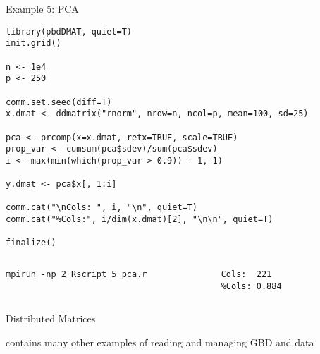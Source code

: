 \begin{frame}[fragile]
\fontsize{8pt}{7.2}\selectfont
  \begin{exampleblock}{Example 5:  PCA}
\begin{lstlisting}[basicstyle=\tiny,title=\fontsize{8pt}{7.2}\selectfont PCA: pca.r]
library(pbdDMAT, quiet=T)
init.grid()

n <- 1e4
p <- 250

comm.set.seed(diff=T)
x.dmat <- ddmatrix("rnorm", nrow=n, ncol=p, mean=100, sd=25)

pca <- prcomp(x=x.dmat, retx=TRUE, scale=TRUE)
prop_var <- cumsum(pca$sdev)/sum(pca$sdev)
i <- max(min(which(prop_var > 0.9)) - 1, 1)

y.dmat <- pca$x[, 1:i]

comm.cat("\nCols: ", i, "\n", quiet=T)
comm.cat("%Cols:", i/dim(x.dmat)[2], "\n\n", quiet=T)

finalize()
\end{lstlisting} %
\vspace{-.4cm}
  \begin{columns}[t,onlytextwidth]
    \begin{column}{0.58\textwidth}
\begin{lstlisting}[basicstyle=\tiny,backgroundcolor=\color{white},keywordstyle=\color{black},
title=\fontsize{6pt}{7.2}\selectfont Execute this script via:]
mpirun -np 2 Rscript 5_pca.r
\end{lstlisting}    
    \end{column}
    \hfill
    \begin{column}{0.4\textwidth}
\begin{lstlisting}[basicstyle=\tiny,title=\fontsize{6pt}{7.2}\selectfont Sample Output:]
Cols:  221 
%Cols: 0.884 
\end{lstlisting}
    \end{column}
​  \end{columns}
  \end{exampleblock}
\end{frame}



\begin{frame}
  \begin{block}{Distributed Matrices}\pause
  \begin{center}
     contains many other examples of reading and managing GBD and  data
  \end{center}
  \end{block}
\end{frame}


